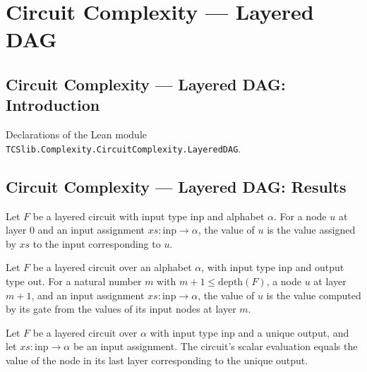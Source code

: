 \section{Circuit Complexity --- Layered DAG}
\subsection*{Circuit Complexity --- Layered DAG: Introduction}

Declarations of the Lean module \texttt{TCSlib.Complexity.CircuitComplexity.LayeredDAG}.

\subsection*{Circuit Complexity --- Layered DAG: Results}

\begin{theorem}
\label{BoolCircuit.LayeredCircuit.evalNode_zero}
\leanok
{}
Let $F$ be a layered circuit with input type $\mathrm{inp}$ and alphabet $\alpha$. For a
node $u$ at layer $0$ and an input assignment $xs:\mathrm{inp}\to\alpha$, the value of
$u$ is the value assigned by $xs$ to the input corresponding to $u$.
\end{theorem}

\begin{theorem}
\label{BoolCircuit.LayeredCircuit.evalNode_succ}
\leanok
{}
Let $F$ be a layered circuit over an alphabet $\alpha$, with input type $\mathrm{inp}$
and output type $\mathrm{out}$. For a natural number $m$ with
$m+1\leq\mathrm{depth}(F)$, a node $u$ at layer $m+1$, and an input assignment
$xs:\mathrm{inp}\to\alpha$, the value of $u$ is the value computed by its gate from the
values of its input nodes at layer $m$.
\end{theorem}

\begin{theorem}
\leanok
{}
Let $F$ be a layered circuit over $\alpha$ with input type $\mathrm{inp}$ and a unique
output, and let $xs:\mathrm{inp}\to\alpha$ be an input assignment. The circuit's scalar
evaluation equals the value of the node in its last layer corresponding to the unique
output.
\end{theorem}

